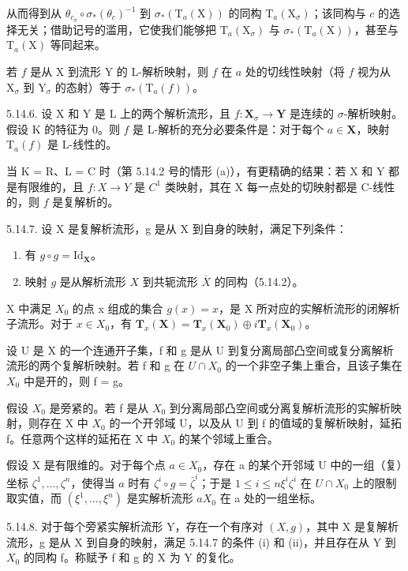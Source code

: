 从而得到从 \(\theta_{c_{\sigma}} \circ \sigma_{*}(\theta_{c})^{-1}\) 到 \(\sigma_{*}(\mathrm{T}_{a}(\mathrm{X}))\) 的同构 \(\mathrm{T}_{a}(\mathrm{X}_{\sigma})\)；该同构与 \(c\) 的选择无关；借助记号的滥用，它使我们能够把 \(\mathrm{T}_{a}(\mathrm{X}_{\sigma})\) 与 \(\sigma_{*}(\mathrm{T}_{a}(\mathrm{X}))\)，甚至与 \(\mathrm{T}_{a}(\mathrm{X})\) 等同起来。

若 \(f\) 是从 X 到流形 Y 的 L-解析映射，则 \(f\) 在 \(a\) 处的切线性映射（将 \(f\) 视为从 \(\mathrm{X}_{\sigma}\) 到 \(\mathrm{Y}_{\sigma}\) 的态射）等于 \(\sigma_{*}(\mathrm{T}_{a}(f))\)。

5.14.6. 设 X 和 Y 是 L 上的两个解析流形，且 \(f: \mathbf{X}_{\sigma} \to \mathbf{Y}\) 是连续的 \(\sigma\)-解析映射。假设 K 的特征为 0。则 \(f\) 是 L-解析的充分必要条件是：对于每个 \(a \in \mathbf{X}\)，映射 \(\mathrm{T}_{a}(f)\) 是 L-线性的。

当 K = R、L = C 时（第 5.14.2 号的情形 (a)），有更精确的结果：若 X 和 Y 都是有限维的，且 \(f: X \to Y\) 是 \(C^{1}\) 类映射，其在 X 每一点处的切映射都是 C-线性的，则 \(f\) 是复解析的。

5.14.7. 设 X 是复解析流形，g 是从 X 到自身的映射，满足下列条件：

\begin{enumerate}
\def\labelenumi{(\roman{enumi})}
\item
  有 \(g \circ g = \mathrm{Id}_{\mathbf{X}}\)。
\item
  映射 \(g\) 是从解析流形 \(X\) 到共轭流形 \(\overline{X}\) 的同构（5.14.2）。
\end{enumerate}

X 中满足 \(X_{0}\) 的点 x 组成的集合 \(g(x) = x\)，是 X 所对应的实解析流形的闭解析子流形。对于 \(x \in X_{0}\)，有 \(\mathbf{T}_{x}(\mathbf{X}) = \mathbf{T}_{x}(\mathbf{X}_{0}) \oplus i\mathbf{T}_{x}(\mathbf{X}_{0})\)。

设 U 是 X 的一个连通开子集，f 和 g 是从 U 到复分离局部凸空间或复分离解析流形的两个复解析映射。若 f 和 g 在 \(U \cap X_{0}\) 的一个非空子集上重合，且该子集在 \(X_{0}\) 中是开的，则 f = g。

假设 \(X_{0}\) 是旁紧的。若 f 是从 \(X_{0}\) 到分离局部凸空间或分离复解析流形的实解析映射，则存在 X 中 \(X_{0}\) 的一个开邻域 U，以及从 U 到 f 的值域的复解析映射，延拓 f。任意两个这样的延拓在 X 中 \(X_{0}\) 的某个邻域上重合。

假设 X 是有限维的。对于每个点 \(a \in X_{0}\)，存在 a 的某个开邻域 U 中的一组（复）坐标 \(\zeta^{1}, \ldots, \zeta^{n}\)，使得当 \(a\) 时有 \(\zeta^{i} \circ g = \bar{\zeta}^{i}\)；于是 \(1 \leqslant i \leqslant n\)\(\xi^{i}\)\(\zeta^{i}\) 在 \(U \cap X_{0}\) 上的限制  取实值，而 \((\xi^{1}, \ldots, \xi^{n})\) 是实解析流形 \(a\)\(X_{0}\) 在 a 处的一组坐标。

5.14.8. 对于每个旁紧实解析流形 Y，存在一个有序对 \((X, g)\)，其中 X 是复解析流形，g 是从 X 到自身的映射，满足 5.14.7 的条件 (i) 和 (ii)，并且存在从 Y 到 \(X_{0}\) 的同构 f。称赋予 f 和 g 的 X 为 Y 的复化。

